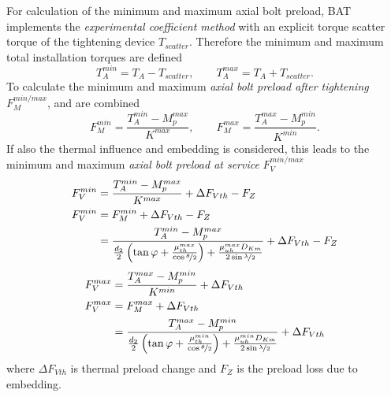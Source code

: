 For calculation of the minimum and maximum axial bolt preload, BAT implements the \emph{experimental coefficient method}
\cite{ECSS_HB_32_23A} with an explicit torque scatter torque of the tightening device $T_{scatter}$. Therefore
the minimum and maximum total installation torques are defined 
\begin{equation}
  T_A^{min} = T_A - T_{scatter} , \qquad T_A^{max} = T_A + T_{scatter}.
  \label{equ:Tscatter}
\end{equation}
To calculate the minimum and maximum \emph{axial bolt preload after tightening} $F_M^{min/max}$, 
 and  are combined 
\begin{equation}
  F_M^{min} = \frac{T_A^{min}-M_p^{max}}{K^{max}} ,\qquad
  F_M^{max} = \frac{T_A^{max}-M_p^{min}}{K^{min}}.
\end{equation}
If also the thermal influence and embedding is considered, this leads to the minimum and maximum
\emph{axial bolt preload at service} $F_V^{min/max}$
\begin{subequations}
  \begin{align}
    F_V^{min} &= \frac{T_A^{min}-M_p^{max}}{K^{max}}+\Delta F_{Vth}-F_Z \\
    F_V^{min} &= F_M^{min}+\Delta F_{Vth}-F_Z \\
    &= \frac{T_A^{min}-M_p^{max}}{\frac{d_2}{2} \left( \tan\varphi + \frac{\mu_{th}^{max}}
    {\cos\nicefrac{\theta}{2}} \right) + \frac{\mu_{uh}^{max} D_{Km}}
    {2 \sin\nicefrac{\lambda}{2}}}+\Delta F_{Vth}-F_Z
    \label{equ:FVmin}
  \end{align}
\end{subequations}
\begin{subequations}
  \begin{align}
    F_V^{max} &= \frac{T_A^{max}-M_p^{min}}{K^{min}}+\Delta F_{Vth} \\
    F_V^{max} &= F_M^{max}+\Delta F_{Vth} \\
    &= \frac{T_A^{max}-M_p^{min}}{\frac{d_2}{2} \left( \tan\varphi + \frac{\mu_{th}^{min}}
    {\cos\nicefrac{\theta}{2}} \right) + \frac{\mu_{uh}^{min} D_{Km}}
    {2 \sin\nicefrac{\lambda}{2}}}+\Delta F_{Vth}
    \label{equ:FVmax}
  \end{align}
\end{subequations}
where $\Delta F_{Vth}$ is thermal preload change and $F_Z$ is the preload loss due to embedding.